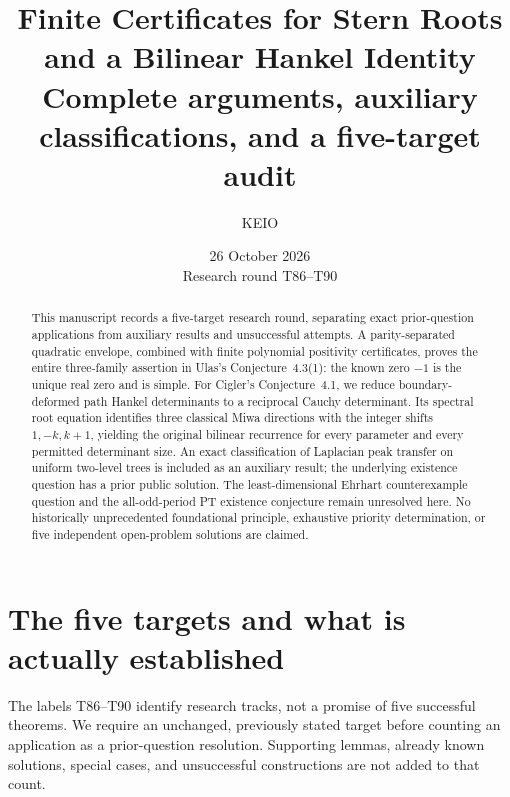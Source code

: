 \documentclass[11pt,a4paper]{article}
\title{Finite Certificates for Stern Roots\\and a Bilinear Hankel Identity\\[5pt]\large Complete arguments, auxiliary classifications, and a five-target audit}
\author{KEIO}
\date{26 October 2026\\[3pt]\small Research round T86--T90}
\theoremstyle{definition}\newtheorem{definition}[theorem]{Definition}
\theoremstyle{remark}\newtheorem{remark}[theorem]{Remark}
\begin{document}
\maketitle
\begin{abstract}
This manuscript records a five-target research round, separating exact
prior-question applications from auxiliary results and unsuccessful
attempts. A parity-separated quadratic envelope, combined with finite
polynomial positivity certificates, proves the entire three-family
assertion in Ulas's Conjecture~4.3(1): the known zero $-1$ is the
unique real zero and is simple. For Cigler's Conjecture~4.1,
we reduce boundary-deformed path Hankel determinants to a reciprocal
Cauchy determinant. Its spectral root equation identifies three classical
Miwa directions with the integer shifts $1,-k,k+1$, yielding the original
bilinear recurrence for every parameter and every permitted determinant
size. An exact classification of Laplacian peak transfer on uniform
two-level trees is included as an auxiliary result; the underlying
existence question has a prior public solution. The least-dimensional
Ehrhart counterexample question and the all-odd-period PT existence
conjecture remain unresolved here. No historically unprecedented
foundational principle, exhaustive priority determination, or five
independent open-problem solutions are claimed.
\end{abstract}

\section{The five targets and what is actually established}

The labels T86--T90 identify research tracks, not a promise of five
successful theorems. We require an unchanged, previously stated target
before counting an application as a prior-question resolution. Supporting
lemmas, already known solutions, special cases, and unsuccessful
constructions are not added to that count.
\end{document}
